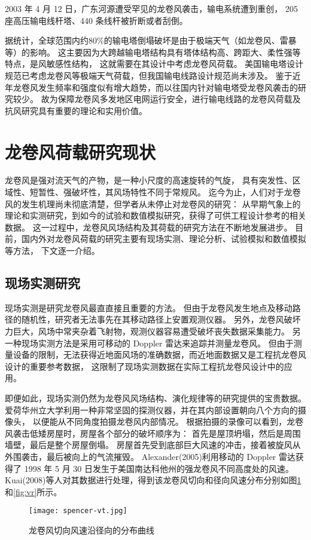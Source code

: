 2003 年 4 月 12 日，广东河源遭受罕见的龙卷风袭击，输电系统遭到重创，
205 座高压输电线杆塔、440 条线杆被折断或者刮倒\cite{zhang2006shudianxian}。

据统计，全球范围内约$80\%$的输电塔倒塌破坏是由于极端天气（如龙卷风、雷暴等）的影响\cite{hamada2010finite}。
这主要因为大跨越输电塔结构具有塔体结构高、跨距大、柔性强等特点，是风敏感性结构，
这就需要在其设计中考虑龙卷风荷载。
美国输电塔设计规范已考虑龙卷风等极端天气荷载，但我国输电线路设计规范尚未涉及。
鉴于近年龙卷风发生频率和强度似有增大趋势，而以往国内针对输电塔受龙卷风袭击的研究较少。
故为保障龙卷风多发地区电网运行安全，进行输电线路的龙卷风荷载及抗风研究具有重要的理论和实用价值。

\section{龙卷风荷载研究现状}
龙卷风是强对流天气的产物，是一种小尺度的高速旋转的气旋，
具有突发性、区域性、短暂性、强破坏性，其风场特性不同于常规风。
迄今为止，人们对于龙卷风的发生机理尚未彻底清楚，但学者从未停止对龙卷风的研究：
从早期气象上的理论和实测研究，到如今的试验和数值模拟研究，获得了可供工程设计参考的相关数据。
这一过程中，龙卷风风场结构及其荷载的研究方法在不断地发展进步。
目前，国内外对龙卷风荷载的研究主要有现场实测、理论分析、试验模拟和数值模拟等方法，
下文逐一介绍。

\subsection{现场实测研究}
现场实测是研究龙卷风最直直接且重要的方法。
但由于龙卷风发生地点及移动路径的随机性，研究者无法事先在其移动路径上安置观测仪器。
另外，龙卷风破坏力巨大，风场中常夹杂着飞射物，观测仪器容易遭受破坏丧失数据采集能力。
另一种现场实测方法是采用可移动的 Doppler 雷达来追踪并测量龙卷风。
但由于测量设备的限制，无法获得近地面风场的准确数据，而近地面数据又是工程抗龙卷风设计的重要参考数据，
这限制了现场实测数据在实际工程抗龙卷风设计中的应用。

即便如此，现场实测仍然为龙卷风风场结构、演化规律等的研究提供的宝贵数据。
爱荷华州立大学利用一种非常坚固的探测仪器，并在其内部设置朝向八个方向的摄像头，
以便能从不同角度拍摄龙卷风内部情况。
根据拍摄的录像可以看到，龙卷风袭击低矮房屋时，房屋各个部分的破坏顺序为：
首先是屋顶坍塌，然后是周围墙壁，最后是整个房屋倒塌。
房屋首先受到底部巨大风速的冲击，接着被旋风从外围袭击，最后被向上的气流摧毁。
Alexander(2005)\cite{alexander200530}利用移动的 Doppler 雷达获得了 1998 年 5 月 30 日发生于美国南达科他州的强龙卷风不同高度处的风速。
Kuai(2008)\cite{kuai2008cfd}等人对其数据进行处理，得到该龙卷风切向和径向风速分布分别如图\ref{fig:vt}和\ref{fig:vr}所示。
\begin{figure}[!htbp]
    \centering
    \texttt{[image: spencer-vt.jpg]}
    \caption{龙卷风切向风速沿径向的分布曲线}
    \label{fig:vt}
\end{figure}

